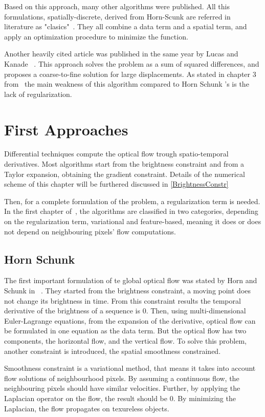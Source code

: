 \documentclass[12pt,a4paper,twoside]{report}
\begin{document}
Based on this approach, many other algorithms were published. All this formulations, spatially-discrete, derived from Horn-Scunk are referred in literature as "clasics"~\cite{sun2010,QAnalysis}. They all combine a data term and a spatial term, and apply an optimization procedure to minimize the function. 

Another heavily cited article was published in the same year by Lucas and Kanade ~\cite{lucas1981}. This approach solves the problem as a sum of squared differences, and proposes a coarse-to-fine solution for large displacements. As stated in chapter 3 from~\cite{mitiche2014computer} the main weakness of this algorithm compared to Horn Schunk 's is the lack of regularization.
 


\section{First Approaches}

Differential techniques compute the optical flow trough spatio-temporal derivatives.
Most algorithms start from the brightness constraint and from a Taylor expansion, obtaining the gradient constraint. Details of the numerical scheme of this chapter will be furthered discussed in \ref{BrightnessConstr}

Then, for a complete formulation of the problem, a regularization term is needed. In the first chapter of~\cite{wedel2011stereo}, the algorithms are classified in two categories, depending on the regularization term, variational and feature-based, meaning it does or does not depend on neighbouring pixels' flow computations.
\subsection{Horn Schunk}
The first important formulation of te global optical flow was stated by Horn and Schunk in ~\cite{HSOpticalFlow}. They started from the brightness constraint, a moving point does not change its brightness in time. From this constraint results the temporal derivative of the brightness of a sequence is $0$. Then,  using multi-dimensional Euler-Lagrange equations, from the expansion of the derivative, optical flow  can be formulated in one equation as the data term. But the optical flow has two components, the horizontal flow, and the vertical flow. To solve this problem, another constraint is introduced, the spatial smoothness constrained. 

Smoothness constraint is a variational method, that means it takes into account flow solutions of neighbourhood pixels. By assuming a continuous flow, the neighbouring pixels should have similar velocities\cite{HSOpticalFlow}. Further, by applying the Laplacian operator on the flow, the result should be 0. By minimizing the Laplacian, the flow propagates on texureless objects.
\end{document}
